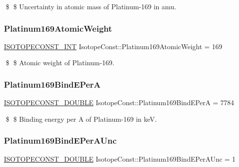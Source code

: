 \$ \$ Uncertainty in atomic mass of Platinum-\/169 in amu. \mbox{\label{group___isotope_const-_platinum-_pt169_ga5dc97e47ebaf21f13dfd0d5019557af8}} 
\subsubsection{\texorpdfstring{Platinum169\+Atomic\+Weight}{Platinum169AtomicWeight}}
{\footnotesize\ttfamily \mbox{\hyperlink{group___isotope_const-_macros_ga5f18360b3e99483a35c32d789e62621c}{I\+S\+O\+T\+O\+P\+E\+C\+O\+N\+S\+T\+\_\+\+I\+NT}} Isotope\+Const\+::\+Platinum169\+Atomic\+Weight = 169}

\$ \$ Atomic weight of Platinum-\/169. \mbox{\label{group___isotope_const-_platinum-_pt169_gafeba8d33be2608aae987e9778b00c48f}} 
\subsubsection{\texorpdfstring{Platinum169\+Bind\+E\+PerA}{Platinum169BindEPerA}}
{\footnotesize\ttfamily \mbox{\hyperlink{group___isotope_const-_macros_ga8f45a7272ce02c0b4c65c44636ed719a}{I\+S\+O\+T\+O\+P\+E\+C\+O\+N\+S\+T\+\_\+\+D\+O\+U\+B\+LE}} Isotope\+Const\+::\+Platinum169\+Bind\+E\+PerA = 7784}

\$ \$ Binding energy per A of Platinum-\/169 in keV. \mbox{\label{group___isotope_const-_platinum-_pt169_ga6c6636b5a99463bebdade536b0c9bca6}} 
\subsubsection{\texorpdfstring{Platinum169\+Bind\+E\+Per\+A\+Unc}{Platinum169BindEPerAUnc}}
{\footnotesize\ttfamily \mbox{\hyperlink{group___isotope_const-_macros_ga8f45a7272ce02c0b4c65c44636ed719a}{I\+S\+O\+T\+O\+P\+E\+C\+O\+N\+S\+T\+\_\+\+D\+O\+U\+B\+LE}} Isotope\+Const\+::\+Platinum169\+Bind\+E\+Per\+A\+Unc = 1}

